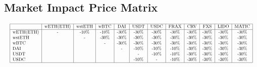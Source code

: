 \documentclass[conference]{IEEEtran}
\begin{document}
\begin{appendices}
\section{Market Impact Price Matrix}
$$\resizebox{\textwidth}{!}{\begin{tabular}{|l|c|c|c|c|c|c|c|c|c|c|c|c|c|}
  \hline
   & wETH(ETH) & wstETH & wBTC & DAI & USDT & USDC & FRAX & CRV & FXS & LIDO & MATIC \\
  \hline
  wETH(ETH) & - & -10$\%$ & -10$\%$ & -30$\%$ & -30$\%$ & -30$\%$ & -30$\%$ & -30$\%$ & -30$\%$ & -30$\%$ & -30$\%$  \\
  wstETH &  & - & -30$\%$ & -30$\%$ & -30$\%$ & -30$\%$ & -30$\%$ & -30$\%$ & -30$\%$ & -30$\%$ & -30$\%$\\
  wBTC &  &  & - & -30$\%$ & -30$\%$ & -30$\%$ & -30$\%$ & -30$\%$ & -30$\%$ & -30$\%$ & -30$\%$ \\
  DAI &  &  &  & - & -10$\%$ & -10$\%$ & -10$\%$ & -30$\%$ & -30$\%$ & -30$\%$ & -30$\%$ \\
  USDT &  &  &  &  & - & -10$\%$ & -10$\%$ & -30$\%$ & -30$\%$ & -30$\%$ & -30$\%$\\
 USDC &  &  &  &  & -10$\%$ & - & -10$\%$ & -30$\%$ & -30$\%$ & -30$\%$ & -30$\%$\\
  \hline
\end{tabular}}$$
\end{appendices}
\end{document}
